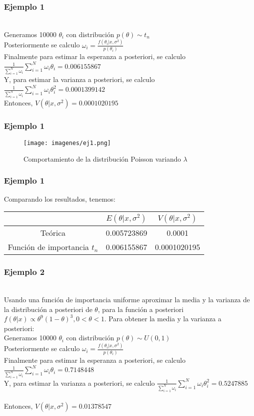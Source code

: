 \documentclass[12pt]{beamer}
\begin{document}
\begin{frame}
\frametitle{Ejemplo 1}
~\\Generamos 10000 $\theta_{i}$ con distribución $p(\theta)\sim t_{n}$
~\\Posteriormente se calculo $\omega_{i}=\frac{f(\theta_{i}|x,\sigma^2)}{p(\theta_{i})}$
~\\Finalmente para estimar la esperanza a posteriori, se calculo $\frac{1}{\sum\limits_{i=1}^{N}\omega_{i}}\sum\limits_{i=1}^{N}\omega_{i}\theta_{i}=0.006155867$
~\\Y, para estimar la varianza a posteriori, se calculo $\frac{1}{\sum\limits_{i=1}^{N}\omega_{i}}\sum\limits_{i=1}^{N}\omega_{i}\theta_{i}^2=0.0001399142$
~\\Entonces, $V(\theta|x,\sigma^2)=0.0001020195$
\end{frame}

\begin{frame}
\frametitle{Ejemplo 1}
\begin{figure}[!h]
    \begin{center}
        \texttt{[image: imagenes/ej1.png]}
        \caption{Comportamiento de la distribución Poisson variando $\lambda$}
        \label{fig:Densidad}
    \end{center}
\end{figure}
\end{frame}

\begin{frame}
\frametitle{Ejemplo 1}
Comparando los resultados, tenemos:
\begin{center}
\begin{tabular}{|c|c|c|}
\hline 
 & $E(\theta|x,\sigma^2)$ & $V(\theta|x,\sigma^2)$ \\ 
\hline 
Teórica & 0.005723869 & 0.0001 \\ 
Función de importancia $t_{n}$ &  0.006155867 & 0.0001020195 \\ 
\hline 
\end{tabular} 
\end{center}
\end{frame}

\begin{frame}
\frametitle{Ejemplo 2}
~\\ Usando una función de importancia uniforme aproximar la media y la varianza de la distribución a posteriori de $\theta$, para la función a posteriori $f(\theta|x)\propto \theta^9(1-\theta)^3, 0<\theta<1$. Para obtener la media y la varianza a posteriori:
~\\Generamos 10000 $\theta_{i}$ con distribución $p(\theta)\sim U(0,1)$
~\\Posteriormente se calculo $\omega_{i}=\frac{f(\theta_{i}|x,\sigma^2)}{p(\theta_{i})}$
~\\Finalmente para estimar la esperanza a posteriori, se calculo $\frac{1}{\sum\limits_{i=1}^{N}\omega_{i}}\sum\limits_{i=1}^{N}\omega_{i}\theta_{i}=0.7148448$
~\\Y, para estimar la varianza a posteriori, se calculo $\frac{1}{\sum\limits_{i=1}^{N}\omega_{i}}\sum\limits_{i=1}^{N}\omega_{i}\theta_{i}^2=0.5247885$
~\\Entonces, $V(\theta|x,\sigma^2)=0.01378547$
\end{frame}
\end{document}
